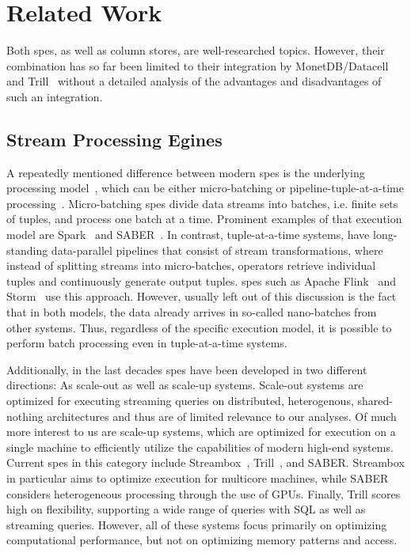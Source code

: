 \section{Related Work}
\label{sec:related-work}

Both \acp{spe}, as well as column stores, are well-researched topics.
However, their combination has so far been limited to their integration by MonetDB/Datacell~\cite{DBLP:journals/pvldb/LiarouIMK12} and Trill~\cite{DBLP:journals/pvldb/ChandramouliGBDPTW14} without a detailed analysis of the advantages and disadvantages of such an integration.

\subsection{Stream Processing Egines}

A repeatedly mentioned difference between modern \acp{spe} is the underlying processing model~\cite{DBLP:journals/pvldb/ZeuchBRMKLRTM19}, which can be either micro-batching or pipeline-tuple-at-a-time processing~\cite{DBLP:journals/pvldb/AkidauBCCFLMMPS15,DBLP:conf/cloud/BattreEHKMW10,DBLP:conf/pldi/ChambersRPAHBW10,DBLP:conf/osdi/DeanG04,DBLP:conf/nsdi/ZahariaCDDMMFSS12}.
Micro-batching \acp{spe} divide data streams into batches, i.e. finite sets of tuples, and process one batch at a time.
Prominent examples of that execution model are Spark~\cite{DBLP:journals/cacm/ZahariaXWDADMRV16} and SABER~\cite{DBLP:conf/sigmod/KoliousisWFWCP16}.
In contrast, tuple-at-a-time systems, have long-standing data-parallel pipelines that consist of stream transformations, where instead of splitting streams into micro-batches, operators retrieve individual tuples and continuously generate output tuples.
\acp{spe} such as Apache Flink~\cite{DBLP:journals/cacm/ZahariaXWDADMRV16} and Storm~\cite{DBLP:conf/sigmod/ToshniwalTSRPKJGFDBMR14} use this approach.
However, usually left out of this discussion is the fact that in both models, the data already arrives in so-called nano-batches from other systems.
Thus, regardless of the specific execution model, it is possible to perform batch processing even in tuple-at-a-time systems.

Additionally, in the last decades \acp{spe} have been developed in two different directions: As scale-out as well as scale-up systems.
Scale-out systems are optimized for executing streaming queries on distributed, heterogenous, shared-nothing architectures and thus are of limited relevance to our analyses. 
Of much more interest to us are scale-up systems, which are optimized for execution on a single machine to efficiently utilize the capabilities of modern high-end systems.
Current \acp{spe} in this category include Streambox~\cite{DBLP:conf/usenix/MiaoPJPML17}, Trill~\cite{DBLP:journals/pvldb/ChandramouliGBDPTW14}, and SABER.
Streambox in particular aims to optimize execution for multicore machines, while SABER considers heterogeneous processing through the use of GPUs.
Finally, Trill scores high on flexibility, supporting a wide range of queries with SQL as well as streaming queries.
However, all of these systems focus primarily on optimizing computational performance, but not on optimizing memory patterns and access.

